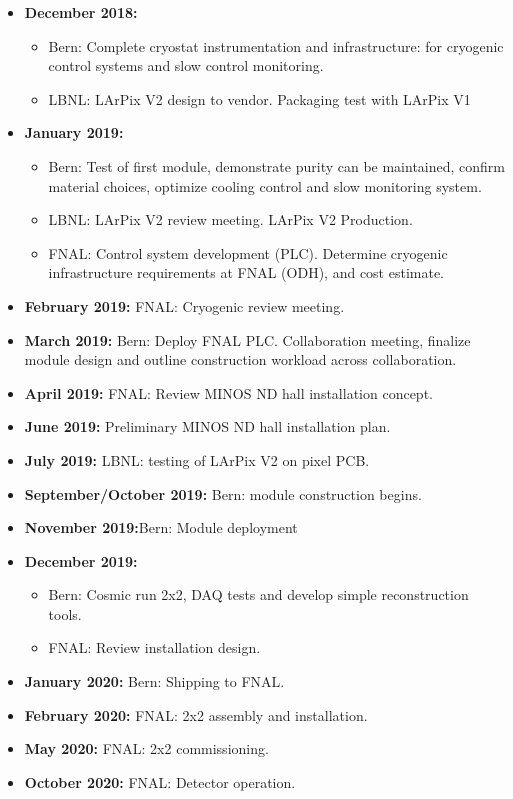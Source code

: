 \begin{itemize}
\item {\bf December 2018:}
\begin{itemize}
\item Bern: Complete cryostat instrumentation and infrastructure: for cryogenic control systems and slow control monitoring. 
\item LBNL: LArPix V2 design to vendor. Packaging test with LArPix V1
\end{itemize}
\item {\bf January 2019:} 
\begin{itemize}
	\item Bern: Test of first module, demonstrate purity can be maintained, confirm material choices, optimize cooling control and slow monitoring system.   
	\item LBNL: LArPix V2 review meeting. LArPix V2 Production.
	\item FNAL: Control system development (PLC). Determine cryogenic infrastructure requirements at FNAL (ODH), and cost estimate.  
\end{itemize}
\item {\bf February 2019:} FNAL: Cryogenic review meeting.  
\item {\bf March 2019:} Bern: Deploy FNAL PLC. Collaboration meeting, finalize module design and outline construction workload across collaboration.    
\item {\bf April 2019:} FNAL: Review MINOS ND hall installation concept.
\item {\bf June 2019:} Preliminary MINOS ND hall installation plan.
\item {\bf July 2019:} LBNL: testing of LArPix V2 on pixel PCB.
\item {\bf September/October 2019:} Bern: module construction begins.
 \item {\bf November 2019:}Bern: Module deployment 
\item {\bf December 2019:} 
\begin{itemize}
	\item Bern: Cosmic run  2x2, DAQ tests and develop simple reconstruction tools.   
	\item FNAL: Review installation design.  
\end{itemize}
\item {\bf January 2020:} Bern: Shipping to FNAL.
\item {\bf February 2020:} FNAL: 2x2 assembly and installation.
\item {\bf May 2020:} FNAL: 2x2 commissioning.    
\item {\bf October 2020:} FNAL: Detector operation.

\end{itemize}

